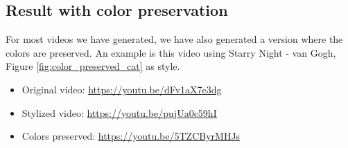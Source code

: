 \subsection{Result with color preservation}
\label{sec:color_preserve_result}
For most videos we have generated, we have also generated a version where the colors are preserved. An example is this video using Starry Night - van Gogh, Figure \ref{fig:color_preserved_cat} as style.
\begin{itemize}
\item{Original video: \url{https://youtu.be/dFv1aX7e3dg}}
\item{Stylized video: \url{https://youtu.be/pujUa0c59hI}}
\item{Colors preserved: \url{https://youtu.be/5TZCByrMHJs}}
\end{itemize}